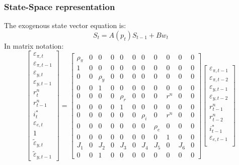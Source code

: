 \documentclass{beamer}
\begin{document}
\begin{frame} 
\frametitle{State-Space representation} 
The exogenous state vector equation is:
\begin{equation}
S_t = A(p_t) S_{t-1} + B w_t
\end{equation}
In matrix notation:
\tiny{
\begin{equation}
\begin{bmatrix}
\varepsilon_{\pi,t} \\
\varepsilon_{\pi,t-1} \\
\varepsilon_{y,t} \\
\varepsilon_{y,t-1} \\
r_t^n \\
r_{t-1}^n \\
i_t^* \\
\varepsilon_{e,t} \\
1 \\
\tilde{\varepsilon}_{y,t} \\
\tilde{\varepsilon}_{y,t-1}
\end{bmatrix}
=
\begin{bmatrix}
\rho_\pi & 0 & 0 & 0 & 0 & 0 & 0 & 0 & 0 & 0 & 0 \\
1 & 0 & 0 & 0 & 0 & 0 & 0 & 0 & 0 & 0 & 0 \\
0 & 0 & \rho_y & 0 & 0 & 0 & 0 & 0 & 0 & 0 & 0 \\
0 & 0 & 1 & 0 & 0 & 0 & 0 & 0 & 0 & 0 & 0\\
0 & 0 & 0 & 0 & \rho_r & 0 & 0 & 0 & r^n & 0 & 0 \\
0 & 0 & 0 & 0 & 1 & 0 & 0 & 0 & 0 & 0 & 0 \\
0 & 0 & 0 & 0 & 0 & 0 & \rho_i & 0 & r^n & 0 & 0 \\
0 & 0 & 0 & 0 & 0 & 0 & 0 & \rho_e & 0 & 0 & 0 \\
0 & 0 & 0 & 0 & 0 & 0 & 0 & 0 & 1 & 0 & 0 \\
J_1 & 0 & J_2 & 0 & J_3 & 0 & J_4 & J_5 & 0 & J_6 & 0 \\
0 & 0 & 1 & 0 & 0 & 0 & 0 & 0 & 0 & 0 & 0
\end{bmatrix}
\begin{bmatrix}
\varepsilon_{\pi,t-1} \\
\varepsilon_{\pi,t-2} \\
\varepsilon_{y,t-1} \\
\varepsilon_{y,t-2} \\
r_{t-1}^n \\
r_{t-2}^n \\
i_{t-1}^* \\
\varepsilon_{e,t-1} \\

\end{bmatrix}
\end{equation}}
\end{frame}
\end{document}
